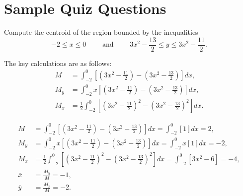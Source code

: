 \documentclass{ximera}
\begin{document}
\section*{Sample Quiz Questions}
\begin{question}%

Compute the centroid of the region bounded by the inequalities \[-2 \leq x \leq 0 \qquad \text{ and } \qquad {3x^2-\frac{13}{2}} \leq y \leq {3x^2-\frac{11}{2}}.\]
\begin{multiplechoice}
\end{multiplechoice}
\begin{feedback}
The key calculations are as follows: 
\[ \begin{aligned}
M & = \int_{-2}^{0} \left[ \left({3x^2-\frac{11}{2}}\right) - \left({3x^2-\frac{13}{2}}\right) \right] dx , \\
M_y & = \int_{-2}^{0} x \left[ \left({3x^2-\frac{11}{2}}\right) - \left({3x^2-\frac{13}{2}}\right) \right] dx, \\
M_x & = \frac{1}{2} \int_{-2}^{0} \left[ \left({3x^2-\frac{11}{2}}\right)^2 - \left({3x^2-\frac{13}{2}}\right)^2 \right] dx.
\end{aligned}\]
 \begin{hint}
 \[ \begin{aligned}
M & = \int_{-2}^{0} \left[ \left({3x^2-\frac{11}{2}}\right) - \left({3x^2-\frac{13}{2}}\right) \right] dx = \int_{-2}^{0} \left[{1}\right] dx = 2, \\
M_y & = \int_{-2}^{0} x \left[ \left({3x^2-\frac{11}{2}}\right) - \left({3x^2-\frac{13}{2}}\right) \right] dx = \int_{-2}^{0} x \left[{1}\right] dx = -2, \\
M_x & = \frac{1}{2} \int_{-2}^{0} \left[ \left({3x^2-\frac{11}{2}}\right)^2 - \left({3x^2-\frac{13}{2}}\right)^2 \right] dx = \int_{-2}^{0} \left[{3x^2-6}\right] = -4, \\
 \overline{x} &  = \frac{M_y}{M} = -1, \\
 \overline{y} &  = \frac{M_x}{M} = -2.\end{aligned}\]
 \end{hint}
\end{feedback}

\end{question}
\end{document}
